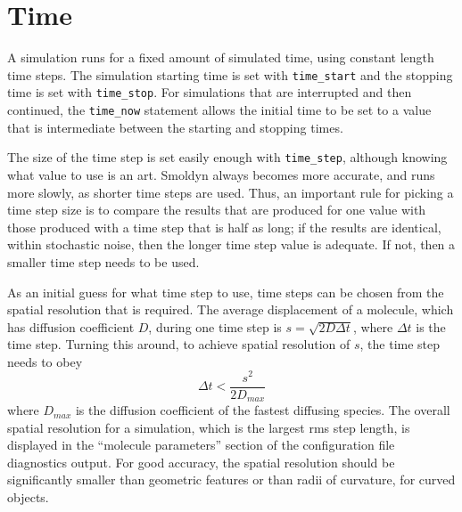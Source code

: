 \documentclass {scrbook}
\newcommand {\ttt} {\texttt}
\begin{document}
\section{Time}

A simulation runs for a fixed amount of simulated time, using constant length time steps. The simulation starting time is set with \ttt{time\_start} and the stopping time is set with \ttt{time\_stop}. For simulations that are interrupted and then continued, the \ttt{time\_now} statement allows the initial time to be set to a value that is intermediate between the starting and stopping times.

The size of the time step is set easily enough with \ttt{time\_step}, although knowing what value to use is an art. Smoldyn always becomes more accurate, and runs more slowly, as shorter time steps are used. Thus, an important rule for picking a time step size is to compare the results that are produced for one value with those produced with a time step that is half as long; if the results are identical, within stochastic noise, then the longer time step value is adequate. If not, then a smaller time step needs to be used.

As an initial guess for what time step to use, time steps can be chosen from the spatial resolution that is required. The average displacement of a molecule, which has diffusion coefficient $D$, during one time step is $s = \sqrt{2D \Delta t}$, where $\Delta t$ is the time step. Turning this around, to achieve spatial resolution of $s$, the time step needs to obey
$$\Delta t < \frac{s^2}{2D_{max}}$$
where $D_{max}$ is the diffusion coefficient of the fastest diffusing species. The overall spatial resolution for a simulation, which is the largest rms step length, is displayed in the ``molecule parameters'' section of the configuration file diagnostics output. For good accuracy, the spatial resolution should be significantly smaller than geometric features or than radii of curvature, for curved objects.
\end{document}
